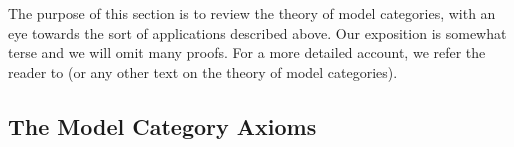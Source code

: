 
The purpose of this section is to review the theory of model categories, with an eye towards the sort of applications described above. Our exposition is somewhat terse and we will omit many proofs.
For a more detailed account, we refer the reader to \cite{hovey} (or any other text on the theory of model categories).

\subsection{The Model Category Axioms}

